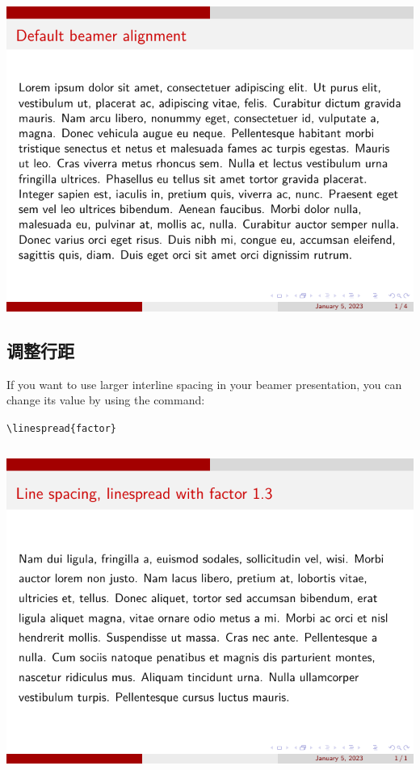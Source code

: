 \includegraphics[page=3]{examples/beamer/beamertextformat04.pdf}

\subsection{调整行距}

If you want to use larger interline spacing in your beamer presentation, you can change its value by using the command:

\verb|\linespread{factor}|

\inputminted[linenos=true]{latex}{examples/beamer/beamertextformat05.tex}

\includegraphics{examples/beamer/beamertextformat05.pdf}

